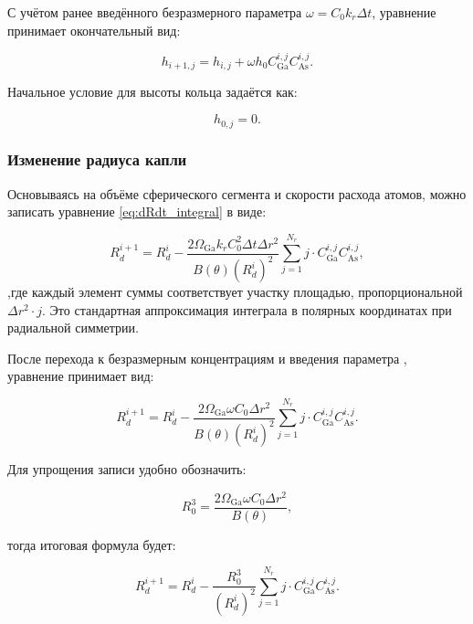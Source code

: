 \documentclass[14pt,oneside]{extarticle}
\begin{document}
С учётом ранее введённого безразмерного параметра \( \omega = C_0 k_r \Delta t \), уравнение принимает окончательный вид:

\begin{equation}
h_{i+1,j} = h_{i,j} + \omega h_0 C_{\text{Ga}}^{i,j} C_{\text{As}}^{i,j}.
\end{equation}

Начальное условие для высоты кольца задаётся как:

\begin{equation}
h_{0,j} = 0.
\end{equation}

\subsubsection{Изменение радиуса капли}

Основываясь на объёме сферического сегмента и скорости расхода атомов, можно записать уравнение \eqref{eq:dRdt_integral} в виде:

\begin{equation}
R_d^{i+1} = R_d^i - \frac{2 \Omega_{\text{Ga}} k_r C_0^2 \Delta t \Delta r^2}{B(\theta) (R_d^i)^2} \sum_{j=1}^{N_r} j \cdot C_{\text{Ga}}^{i,j} C_{\text{As}}^{i,j},
\end{equation}
,где каждый элемент суммы соответствует участку площадью, пропорциональной $\Delta r^2 \cdot j$. Это стандартная аппроксимация интеграла в полярных координатах при радиальной симметрии.

После перехода к безразмерным концентрациям и введения параметра , уравнение принимает вид:

\begin{equation}
R_d^{i+1} = R_d^i - \frac{2 \Omega_{\text{Ga}} \omega C_0 \Delta r^2}{B(\theta) (R_d^i)^2} \sum_{j=1}^{N_r} j \cdot C_{\text{Ga}}^{i,j} C_{\text{As}}^{i,j}.
\end{equation}

Для упрощения записи удобно обозначить:

\begin{equation}
R_0^3 = \frac{2 \Omega_{\text{Ga}} \omega C_0 \Delta r^2}{B(\theta)},
\end{equation}

тогда итоговая формула будет:

\begin{equation}
R_d^{i+1} = R_d^i - \frac{R_0^3}{(R_d^i)^2} \sum_{j=1}^{N_r} j \cdot C_{\text{Ga}}^{i,j} C_{\text{As}}^{i,j}.
\end{equation}
\end{document}
